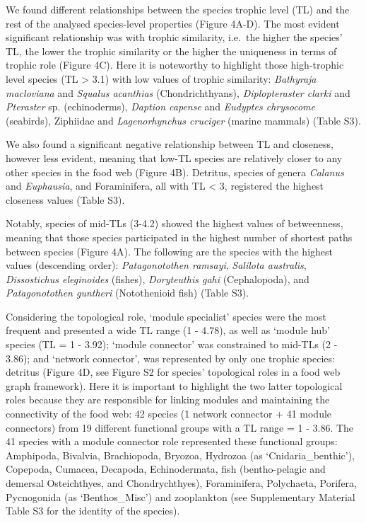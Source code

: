 \documentclass[preprint, 3p,
authoryear]{elsarticle} %
\begin{document}
We found different relationships between the species trophic level (TL)
and the rest of the analysed species-level properties (Figure 4A-D). The
most evident significant relationship was with trophic similarity,
i.e.~the higher the species' TL, the lower the trophic similarity or the
higher the uniqueness in terms of trophic role (Figure 4C). Here it is
noteworthy to highlight those high-trophic level species (TL
\textgreater{} 3.1) with low values of trophic similarity:
\emph{Bathyraja macloviana} and \emph{Squalus acanthias}
(Chondrichthyans), \emph{Diplopteraster clarki} and \emph{Pteraster} sp.
(echinoderms), \emph{Daption capense} and \emph{Eudyptes chrysocome}
(seabirds), Ziphiidae and \emph{Lagenorhynchus cruciger} (marine
mammals) (Table S3).

We also found a significant negative relationship between TL and
closeness, however less evident, meaning that low-TL species are
relatively closer to any other species in the food web (Figure 4B).
Detritus, species of genera \emph{Calanus} and \emph{Euphausia}, and
Foraminifera, all with TL \textless{} 3, registered the highest
closeness values (Table S3).

Notably, species of mid-TLs (3-4.2) showed the highest values of
betweenness, meaning that those species participated in the highest
number of shortest paths between species (Figure 4A). The following are
the species with the highest values (descending order):
\emph{Patagonotothen ramsayi}, \emph{Salilota australis},
\emph{Dissostichus eleginoides} (fishes), \emph{Doryteuthis gahi}
(Cephalopoda), and \emph{Patagonotothen guntheri} (Notothenioid fish)
(Table S3).

Considering the topological role, `module specialist' species were the
most frequent and presented a wide TL range (1 - 4.78), as well as
`module hub' species (TL = 1 - 3.92); `module connector' was constrained
to mid-TLs (2 - 3.86); and `network connector', was represented by only
one trophic species: detritus (Figure 4D, see Figure S2 for species'
topological roles in a food web graph framework). Here it is important
to highlight the two latter topological roles because they are
responsible for linking modules and maintaining the connectivity of the
food web: 42 species (1 network connector + 41 module connectors) from
19 different functional groups with a TL range = 1 - 3.86. The 41
species with a module connector role represented these functional
groups: Amphipoda, Bivalvia, Brachiopoda, Bryozoa, Hydrozoa (as
`Cnidaria\_benthic'), Copepoda, Cumacea, Decapoda, Echinodermata, fish
(bentho-pelagic and demersal Osteichthyes, and Chondrychthyes),
Foraminifera, Polychaeta, Porifera, Pycnogonida (as `Benthos\_Misc') and
zooplankton (see Supplementary Material Table S3 for the identity of the
species).
\end{document}
